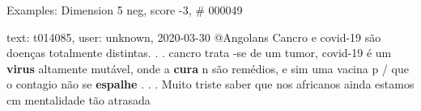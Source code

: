 \begin{frame}{Examples: Dimension 5 neg, score -3, \# 000049}
\footnotesize
\begin{alertblock}{text: t014085, user: unknown, 2020-03-30}
@Angolans Cancro e covid-19 são doenças totalmente distintas. . . cancro trata 
-se de um tumor, covid-19 é um \textbf{virus} altamente mutável, onde a 
\textbf{cura} n são remédios, e sim uma vacina p / que o contagio não se 
\textbf{espalhe} . . . Muito triste saber que nos africanos ainda estamos cm 
mentalidade tão atrasada 
\end{alertblock}
\end{frame}
